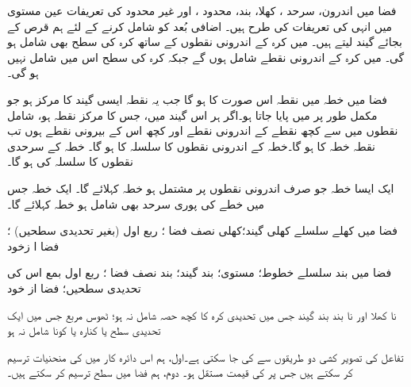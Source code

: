 فضا میں  اندرون، سرحد ، کھلا، بند، محدود  ، اور غیر محدود کی تعریفات عین مستوی میں انہی کی تعریفات کی طرح ہیں۔ اضافی  بُعد  کو شامل کرنے کے لئے  ہم قرص کے   بجائے گیند لیتے ہیں۔  میں کرہ کے  اندرونی نقطوں کے ساتھ   کرہ کی سطح بھی شامل ہو گی۔  میں  کرہ  کے اندرونی نقطے شامل ہوں گے جبکہ کرہ  کی سطح   اس میں شامل نہیں ہو گی۔ 

فضا میں خطہ  میں نقطہ   اس صورت  کا  ہو گا جب  یہ نقطہ  ایسی گیند کا مرکز ہو جو مکمل طور پر  میں پایا جاتا ہو۔اگر ہر  اس  گیند میں، جس کا مرکز نقطہ      ہو،  شامل نقطوں میں سے  کچھ  نقطے      کے اندرونی نقطے     اور کچھ  اس کے بیرونی نقطے   ہوں تب   نقطہ  خطہ   کا  ہو گا۔خطہ  کے اندرونی نقطوں کا  سلسلہ   کا   ہو گا۔ خطہ  کے سرحدی نقطوں کا سلسلہ  کی   ہو گا۔

ایک ایسا خطہ جو صرف اندرونی نقطوں پر مشتمل ہو   خطہ کہلائے  گا۔ ایک  خطہ جس میں خطے کی پوری سرحد بھی  شامل ہو خطہ کہلائے گا۔

\begin{description}
\item{فضا میں کھلے سلسلے}
کھلی گیند؛کھلی نصف فضا ؛ ربع اول (بغیر تحدیدی  سطحیں)  ؛ فضا  ا زخود
\item{فضا میں بند سلسلے}  
خطوط؛ مستوی؛ بند گیند؛ بند نصف فضا ؛ ربع اول بمع اس کی تحدیدی  سطحیں؛ فضا از خود
\item{نا کھلا اور نا بند}
بند گیند جس میں تحدیدی کرہ کا کچھ حصہ شامل نہ ہو؛ ٹھوس مربع جس میں ایک  تحدیدی سطح یا کنارہ   یا کونا شامل نہ ہو 
\end{description}


تفاعل    کی  تصویر کشی دو طریقوں سے کی جا سکتی ہے۔اول،   ہم اس دائرہ کار میں    کی  منحنیات ترسیم کر سکتے ہیں جس پر   کی قیمت مستقل ہو۔ دوم،    ہم فضا میں سطح  ترسیم کر سکتے ہیں۔


